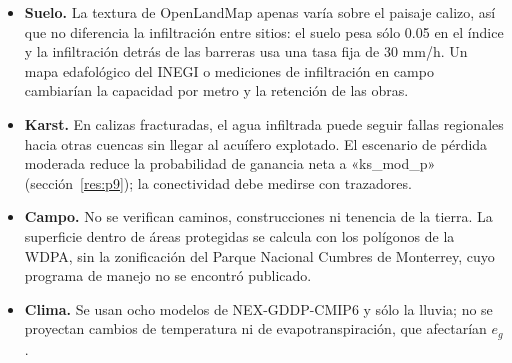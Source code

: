 \begin{itemize}
  \item \textbf{Suelo.} La textura de OpenLandMap apenas varía sobre el paisaje calizo, así que no diferencia la infiltración entre sitios: el suelo pesa sólo 0.05 en el índice y la infiltración detrás de las barreras usa una tasa fija de 30 mm/h. Un mapa edafológico del INEGI o mediciones de infiltración en campo cambiarían la capacidad por metro y la retención de las obras.
  \item \textbf{Karst.} En calizas fracturadas, el agua infiltrada puede seguir fallas regionales hacia otras cuencas sin llegar al acuífero explotado. El escenario de pérdida moderada reduce la probabilidad de ganancia neta a «ks_mod_p» (sección~\ref{res:p9}); la conectividad debe medirse con trazadores.
  \item \textbf{Campo.} No se verifican caminos, construcciones ni tenencia de la tierra. La superficie dentro de áreas protegidas se calcula con los polígonos de la WDPA, sin la zonificación del Parque Nacional Cumbres de Monterrey, cuyo programa de manejo no se encontró publicado.
  \item \textbf{Clima.} Se usan ocho modelos de NEX-GDDP-CMIP6 y sólo la lluvia; no se proyectan cambios de temperatura ni de evapotranspiración, que afectarían $e_g$.
\end{itemize}

